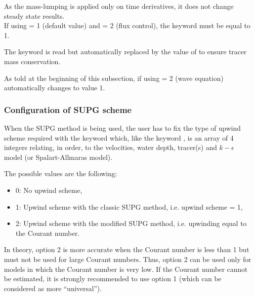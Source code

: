 As the mass-lumping is applied only on time derivatives,
it does not change steady state results.\\

If using  = 1 (default value)
and  = 2 (flux control),
the keyword  must be equal to 1.

The keyword  is read but automatically replaced
by the value of  to ensure tracer mass conservation.

As told at the beginning of this subsection, if using
 = 2 (wave equation) automatically
changes  to value 1.


\subsubsection{Configuration of SUPG scheme}

When the SUPG method is being used, the user has to fix the type of upwind
scheme required with the keyword  which, like the keyword
, is an array of 4 integers relating, in order,
to the velocities, water depth, tracer(s) and $k-\epsilon$ model
(or Spalart-Allmaras model).

The possible values are the following:

\begin{itemize}
\item 0: No upwind scheme,

\item 1: Upwind scheme with the classic SUPG method,
i.e. upwind scheme = 1,

\item 2: Upwind scheme with the modified SUPG method,
i.e. upwinding equal to the Courant number.
\end{itemize}

In theory, option 2 is more accurate when the Courant number is
less than 1 but must not be used for large Courant numbers.
Thus, option 2 can be used only for models in which the Courant number is
very low.
If the Courant number cannot be estimated, it is strongly recommended
to use option 1 (which can be considered as more ``universal'').

